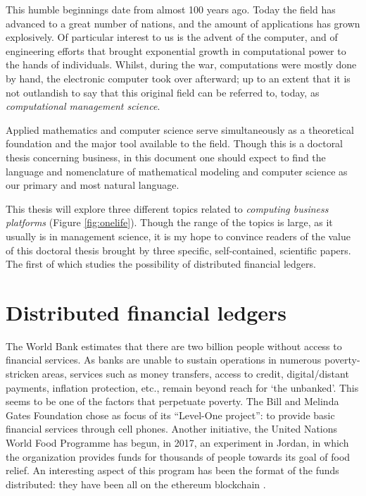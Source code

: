 This humble beginnings date from almost 100 years ago. Today the field has advanced to a great number of nations, and the amount of applications has grown explosively.  Of particular interest to us is the advent of the computer, and of engineering efforts that brought exponential growth in computational power to the hands of individuals.  Whilst, during the war, computations were mostly done by hand, the electronic computer took over afterward; up to an extent that it is not outlandish to say that this original field can be referred to, today, as \emph{computational management science}.

Applied mathematics and computer science serve simultaneously as a theoretical foundation and the major tool available to the field.  Though this is a doctoral thesis concerning business, in this document one should expect to find the language and nomenclature of mathematical modeling and computer science as our primary and most natural language.

This thesis will explore three different topics related to \emph{computing business platforms} (Figure \ref{fig:onelife}). Though the range of the topics is large, as it usually is in management science, it is my hope to convince readers of the value of this doctoral thesis brought by three specific, self-contained, scientific papers.  The first of which studies the possibility of distributed financial ledgers.

\section{Distributed financial ledgers}

The World Bank estimates that there are two billion people without access to financial services. As banks are unable to sustain operations in numerous poverty-stricken areas, services such as money transfers, access to credit, digital/distant payments, inflation protection, etc., remain beyond reach for `the unbanked'.  This seems to be one of the factors that perpetuate poverty.  The Bill and Melinda Gates Foundation chose as focus of its ``Level-One project'': to provide basic financial services through cell phones. Another initiative, the United Nations World Food Programme has begun, in 2017, an experiment in Jordan, in which the organization provides funds for thousands of people towards its goal of food relief.  An interesting aspect of this program has been the format of the funds distributed:  they have been all on the ethereum blockchain \citep{woyke2017blockchain, UN-you-pay-we-take-the-photo, UNFOODPROG}.

